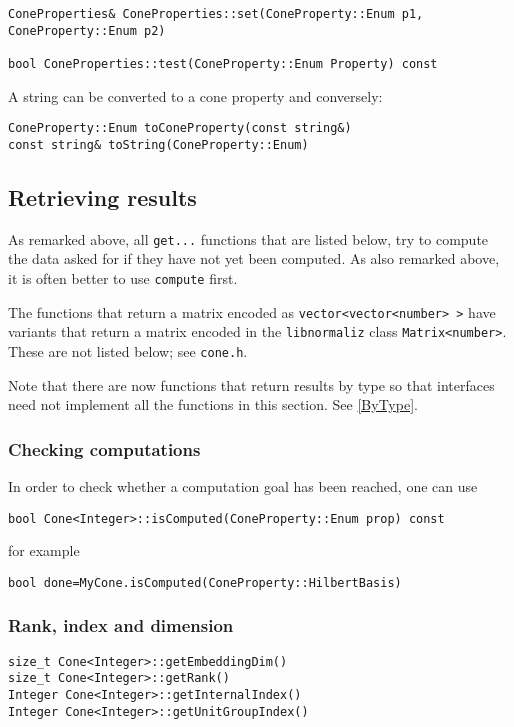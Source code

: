 \documentclass[12pt,a4paper]{scrartcl}
\theoremstyle{definition}
\begin{document}
\begin{small}
\begin{Verbatim}
ConeProperties& ConeProperties::set(ConeProperty::Enum p1, ConeProperty::Enum p2)

bool ConeProperties::test(ConeProperty::Enum Property) const
\end{Verbatim}

A string can be converted to a cone property and conversely:
\begin{Verbatim}
ConeProperty::Enum toConeProperty(const string&)
const string& toString(ConeProperty::Enum)
\end{Verbatim}


\subsection{Retrieving results}

As remarked above, all \verb|get...| functions that are listed below, try to compute the data asked for if they have not yet been computed. As also remarked above, it is often better to use \verb|compute| first.

The functions that return a matrix encoded as \verb|vector<vector<number> >| have variants that return a matrix encoded in the \verb|libnormaliz| class \verb|Matrix<number>|. These are not listed below; see \verb|cone.h|. 

Note that there are now functions that return results by type so that interfaces need not implement all the functions in this section. See \ref{ByType}.

\subsubsection{Checking computations}
In order to check whether a computation goal has been reached, one can use
\begin{Verbatim}
bool Cone<Integer>::isComputed(ConeProperty::Enum prop) const 
\end{Verbatim}
for example
\begin{Verbatim}
bool done=MyCone.isComputed(ConeProperty::HilbertBasis)
\end{Verbatim}

\subsubsection{Rank, index and dimension}

\begin{Verbatim}
size_t Cone<Integer>::getEmbeddingDim()
size_t Cone<Integer>::getRank()
Integer Cone<Integer>::getInternalIndex()
Integer Cone<Integer>::getUnitGroupIndex()


\end{Verbatim}
\end{small}
\end{document}
